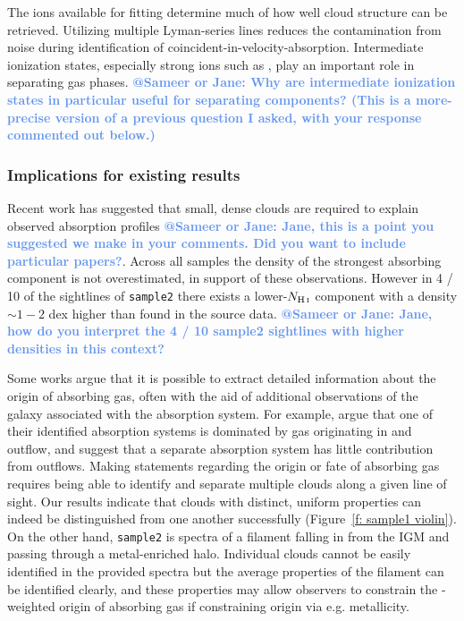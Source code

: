 \documentclass[fleqn,usenatbib]{mnras}
\makeatletter
\newcommand{\atsameer}[1]{\textcolor{CornflowerBlue}{\textbf{@Sameer or Jane: #1}}}
\makeatother
\begin{document}
The ions available for fitting determine much of how well cloud structure can be retrieved.
Utilizing multiple Lyman-series lines reduces the contamination from noise during identification of coincident-in-velocity-absorption.
Intermediate ionization states, especially strong ions such as , play an important role in separating gas phases.
\atsameer{Why are intermediate ionization states in particular useful for separating components? (This is a more-precise version of a previous question I asked, with your response commented out below.)}

\subsubsection{Implications for existing results}

Recent work has suggested that small, dense clouds are required to explain observed absorption profiles \atsameer{Jane, this is a point you suggested we make in your comments. Did you want to include particular papers?}.
Across all samples the density of the strongest absorbing component is not overestimated,
in support of these observations.
However in 4 / 10 of the sightlines of \texttt{sample2} there exists a lower-$N_{\ion{H}{I}}$ component with a density $\sim 1-2$ dex higher than found in the source data.
\atsameer{Jane, how do you interpret the 4 / 10 sample2 sightlines with higher densities in this context?}

Some works argue that it is possible to extract detailed information about the origin of absorbing gas, often with the aid of additional observations of the galaxy associated with the absorption system.
For example, \cite{Peroux2013} argue that one of their identified absorption systems is dominated by gas originating in and outflow, and \cite{Peroux2017} suggest that a separate absorption system has little contribution from outflows.
Making statements regarding the origin or fate of absorbing gas requires being able to identify and separate multiple clouds along a given line of sight.
Our results indicate that clouds with distinct, uniform properties can indeed be distinguished from one another successfully (Figure~\ref{f: sample1 violin}).
On the other hand, \texttt{sample2} is spectra of a filament falling in from the IGM and passing through a metal-enriched halo.
Individual clouds cannot be easily identified in the provided spectra
but the average properties of the filament can be identified clearly,
and these properties may allow observers to constrain the -weighted origin of absorbing gas if constraining origin via e.g. metallicity.
\end{document}
